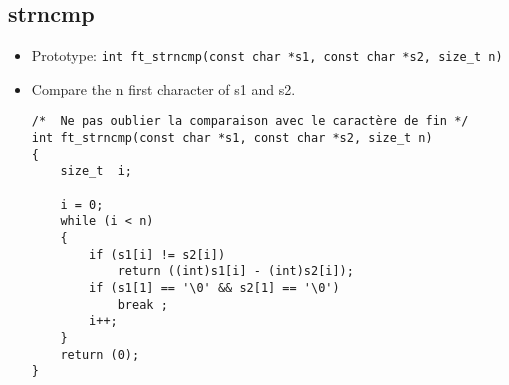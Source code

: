 \documentclass{article}
\begin{document}
		\subsection{strncmp}
			\begin{itemize}[label=$\rightarrow$]
				\item Prototype: \texttt{int ft\_strncmp(const char *s1, const char *s2, size\_t n)}
				\item Compare the n first character of s1 and s2.
				\begin{verbatim}
/*  Ne pas oublier la comparaison avec le caractère de fin */                   
int ft_strncmp(const char *s1, const char *s2, size_t n)                        
{                                                                               
    size_t  i;                                                                  
                                                                                
    i = 0;                                                                      
    while (i < n)                                                               
    {                                                                           
        if (s1[i] != s2[i])                                                     
            return ((int)s1[i] - (int)s2[i]);                                   
        if (s1[1] == '\0' && s2[1] == '\0')                                     
            break ;                                                             
        i++;                                                                    
    }                                                                           
    return (0);                                                                 
}     
				\end{verbatim}
			\end{itemize}
		
\end{document}
